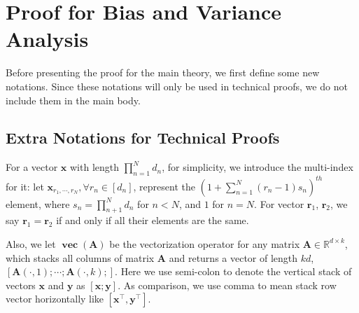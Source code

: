 \section{Proof for Bias and Variance Analysis}
\label{sec:appendix_proof}


Before presenting the proof for the main theory, we first define some new notations. Since these notations will only be used in technical proofs, we do not include them in the main body. 

\subsection*{Extra Notations for Technical Proofs} 
For a vector $\mathbf{x}$ with length $\prod_{n=1}^N d_n$, for simplicity, we introduce the multi-index for it: let $\mathbf{x}_{r_1, \cdots, r_N},\forall r_n \in [d_n]$, represent the $(1 + \sum_{n = 1}^N(r_n -1)s_n)^{th}$ element, where $s_n = \prod_{n+1}^Nd_n$ for $n < N$, and $1$ for $n = N$. For vector $\mathbf{r}_1$, $\mathbf{r}_2$, we say $\mathbf{r}_1 = \mathbf{r}_2$ if and only if 
all their elements are the same. 
\par 

Also, we let $\mathop{\mathbf{vec}}(\mathbf{A})$ be the vectorization operator for any matrix $\mathbf{A}\in \mathbb{R}^{d\times k}$, which stacks all columns of matrix $\mathbf{A}$ and returns a vector of length $kd$, 
$[\mathbf{A}(\cdot, 1); \cdots; \mathbf{A}(\cdot, k); ]$. Here we use semi-colon to denote the vertical stack of vectors $\mathbf{x}$ and $\mathbf{y}$ as $[\mathbf{x}; \mathbf{y}]$. As comparison, we use comma to mean stack row vector horizontally like $[\mathbf{x}^\top, \mathbf{y}^\top]$. 






